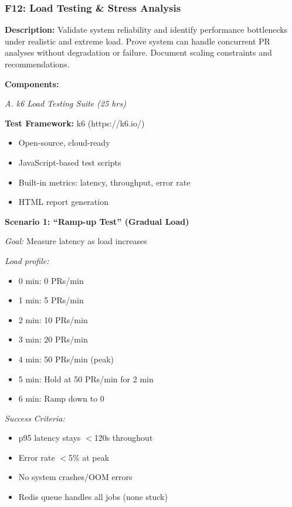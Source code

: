 \documentclass[11pt,a4paper]{article}
\begin{document}
\subsubsection{F12: Load Testing \& Stress Analysis}
\textbf{Description:} Validate system reliability and identify performance bottlenecks under realistic and extreme load. Prove system can handle concurrent PR analyses without degradation or failure. Document scaling constraints and recommendations.

\textbf{Components:}

\textit{A. k6 Load Testing Suite (25 hrs)}

\textbf{Test Framework:} k6 (https://k6.io/)
\begin{itemize}[leftmargin=*]
    \item Open-source, cloud-ready
    \item JavaScript-based test scripts
    \item Built-in metrics: latency, throughput, error rate
    \item HTML report generation
\end{itemize}

\textbf{Scenario 1: ``Ramp-up Test'' (Gradual Load)}

\textit{Goal:} Measure latency as load increases

\textit{Load profile:}
\begin{itemize}[leftmargin=*]
    \item 0 min: 0 PRs/min
    \item 1 min: 5 PRs/min
    \item 2 min: 10 PRs/min
    \item 3 min: 20 PRs/min
    \item 4 min: 50 PRs/min (peak)
    \item 5 min: Hold at 50 PRs/min for 2 min
    \item 6 min: Ramp down to 0
\end{itemize}

\textit{Success Criteria:}
\begin{itemize}[leftmargin=*]
    \item[$\checkmark$] p95 latency stays $<$120s throughout
    \item[$\checkmark$] Error rate $<$5\% at peak
    \item[$\checkmark$] No system crashes/OOM errors
    \item[$\checkmark$] Redis queue handles all jobs (none stuck)
\end{itemize}
\end{document}
